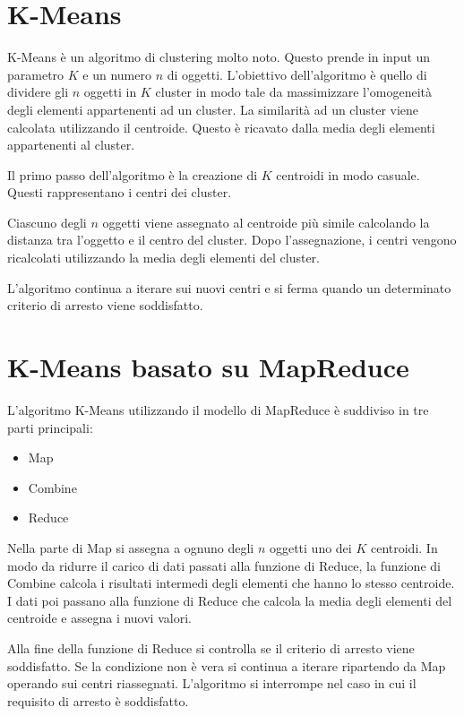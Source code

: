 \documentclass[10pt,twocolumn,letterpaper]{article}
\begin{document}
\section{K-Means}
\label{baseKMeans}
    K-Means è un algoritmo di clustering molto noto. Questo prende in input un
    parametro $K$ e un numero $n$ di oggetti. L'obiettivo dell'algoritmo è quello di
    dividere gli $n$ oggetti in $K$ cluster in modo tale da massimizzare l'omogeneità
    degli elementi appartenenti ad un cluster. La similarità ad un
    cluster viene calcolata utilizzando il centroide. Questo è ricavato dalla media
    degli elementi appartenenti al cluster.

    Il primo passo dell'algoritmo è la creazione di $K$ centroidi in modo casuale.
    Questi rappresentano i centri dei cluster.

    Ciascuno degli $n$ oggetti
    viene assegnato al centroide più simile calcolando la distanza tra l'oggetto
    e il centro del cluster. Dopo l'assegnazione, i centri vengono ricalcolati
    utilizzando la media degli elementi del cluster.

    L'algoritmo continua a iterare sui nuovi centri e si ferma quando
    un determinato criterio di arresto viene soddisfatto.

\section{K-Means basato su MapReduce}
\label{MRKMeans}
    L'algoritmo K-Means utilizzando il modello di MapReduce è suddiviso in tre
    parti principali:
    \begin{itemize}
        \renewcommand{\labelitemi}{\scriptsize$\triangleright$}
        \item Map
        \item Combine
        \item Reduce
    \end{itemize}
    Nella parte di Map si assegna a ognuno degli $n$ oggetti uno dei $K$ centroidi.
    In modo da ridurre il carico di dati passati alla funzione di Reduce, la
    funzione di Combine calcola i risultati intermedi degli elementi
    che hanno lo stesso centroide. I dati poi passano alla funzione di Reduce che
    calcola la media degli elementi del centroide e assegna i nuovi valori.

    Alla fine della funzione di Reduce si controlla se il criterio di arresto viene
    soddisfatto. Se la condizione non è vera si continua a iterare ripartendo da Map
    operando sui centri riassegnati. L'algoritmo si interrompe nel caso in cui
    il requisito di arresto è soddisfatto.
\end{document}
